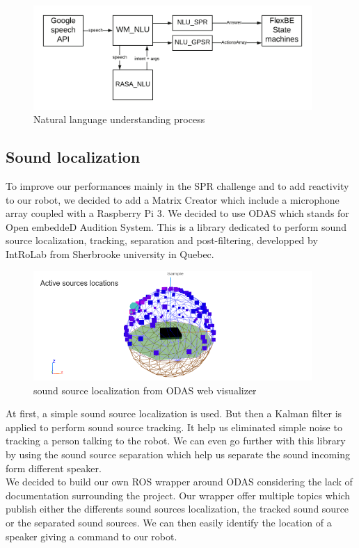 \documentclass[runningheads,a4paper]{llncs}
\begin{document}
\begin{figure}
  \centering
  \includegraphics[width=300pt]{images/wm_nlu.png}
  \caption{Natural language understanding process}
\end{figure} 

\subsection{Sound localization}
\tab To improve our performances mainly in the SPR challenge and to add reactivity to our robot, we decided to add a Matrix Creator which include a microphone array coupled with a Raspberry Pi 3. We decided to use ODAS  \cite{ODAS} which stands for Open embeddeD Audition System. This is a library dedicated to perform sound source localization, tracking, separation and post-filtering, developped by IntRoLab\cite{Introlab} from Sherbrooke university in Quebec.\\ 

\begin{figure}
  \centering
  \includegraphics[width=300pt]{images/odas.png}
  \caption{ sound source localization from ODAS web visualizer \cite{ODAS}}
\end{figure} 

At first, a simple sound source localization is used. But then a Kalman filter is applied to perform sound source tracking. It help us eliminated simple noise to tracking a person talking to the robot. We can even go further with this library by using the sound source separation which help us separate the sound incoming form different speaker.\\

We decided to build our own ROS wrapper around ODAS considering the lack of documentation surrounding the project. Our wrapper offer multiple topics which publish either the differents sound sources localization, the tracked sound source or the separated sound sources. We can then easily identify the location of a speaker giving a command to our robot.\\
\end{document}
